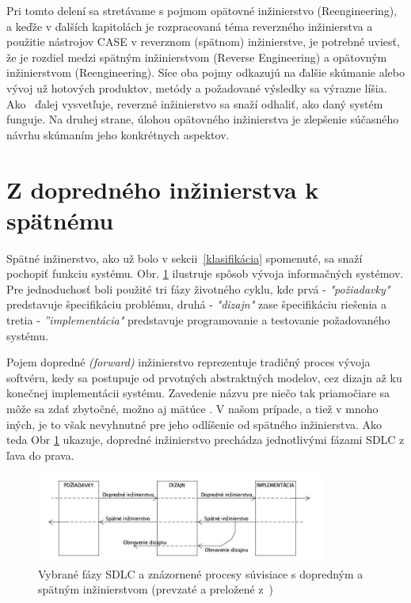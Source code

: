 \documentclass[10pt,twoside,slovak,a4paper]{article}
\begin{document}
Pri tomto delení sa stretávame s pojmom opätovné inžinierstvo (Reengineering), a keďže v ďalších kapitolách je rozpracovaná téma reverzného inžinierstva a použitie nástrojov CASE v reverznom (spätnom) inžinierstve, je potrebné uviesť, že je rozdiel medzi spätným inžinierstvom (Reverse Engineering) a opätovným inžinierstvom (Reengineering). Síce oba pojmy odkazujú na ďalšie skúmanie alebo vývoj už hotových produktov, metódy a požadované výsledky sa výrazne líšia.  Ako~\cite{reengineering} ďalej vysvetľuje, reverzné inžinierstvo sa snaží odhaliť, ako daný systém funguje. Na druhej strane, úlohou opätovného inžinierstva je zlepšenie súčasného návrhu skúmaním jeho konkrétnych aspektov. 


\section{Z dopredného inžinierstva k spätnému}\label{forward vs reverse}


Spätné inžinerstvo, ako už bolo v sekcii~\ref{klasifikácia} spomenuté, sa snaží pochopiť funkciu systému. Obr. \ref{obr_forward_reverse} ilustruje spôsob vývoja informačných systémov. Pre jednoduchosť boli použité tri fázy životného cyklu, kde prvá -  \emph{"požiadavky"} predstavuje špecifikáciu problému, druhá  - \emph{"dizajn"} zase špecifikáciu riešenia a tretia -  \emph{''implementácia"} predstavuje programovanie a testovanie požadovaného systému.


Pojem dopredné \textit{(forward)} inžinierstvo reprezentuje tradičný proces vývoja softvéru, kedy sa postupuje od prvotných abstraktných modelov, cez dizajn až ku konečnej implementácii systému. Zavedenie názvu pre niečo tak priamočiare sa môže sa zdať zbytočné, možno aj mätúce . V našom prípade, a tiež v mnoho iných, je to však nevyhnutné pre jeho odlíšenie od spätného inžinierstva. Ako teda Obr \ref{obr_forward_reverse} ukazuje, dopredné inžinierstvo prechádza jednotlivými fázami SDLC z ľava do prava.
\begin{figure}[h]
\centering
\includegraphics[width=0.85\textwidth]{forward_reverse.jpg}
\caption{Vybrané fázy SDLC a znázornené procesy súvisiace s dopredným a spätným inžinierstvom (prevzaté a preložené z~\cite{2010})}
\label{obr_forward_reverse}
\end{figure}
\end{document}
